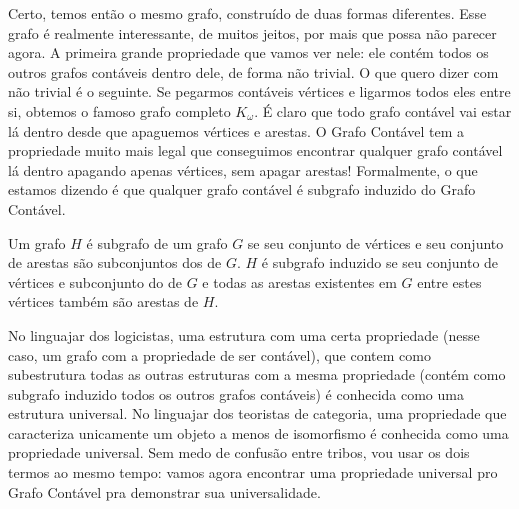\documentclass[11pt]{article}
\theoremstyle{definition}
\theoremstyle{definition}
\theoremstyle{definition}
\theoremstyle{definition}
\theoremstyle{definition}
\theoremstyle{definition}
\theoremstyle{definition}
\theoremstyle{definition}
\newtheorem*{definition*}{Definição}
\newenvironment{definicao*}{
\definecolor{shadecolor}{HTML}{defcfc}
\begin{shaded}
\begin{definition*}
}
{
\end{definition*}
\end{shaded}
}
\theoremstyle{definition}
\theoremstyle{definition}
\theoremstyle{definition}
\theoremstyle{definition}
\theoremstyle{definition}
\begin{document}
Certo, temos então o mesmo grafo, construído de duas formas diferentes. Esse grafo é realmente interessante, de muitos jeitos, por mais que possa não parecer agora. A primeira grande propriedade que vamos ver nele: ele contém todos os outros grafos contáveis dentro dele, de forma não trivial. O que quero dizer com não trivial é o seguinte. Se pegarmos contáveis vértices e ligarmos todos eles entre si, obtemos o famoso grafo completo $K_\omega$. É claro que todo grafo contável vai estar lá dentro desde que apaguemos vértices e arestas. O Grafo Contável tem a propriedade muito mais legal que conseguimos encontrar qualquer grafo contável lá dentro apagando apenas vértices, sem apagar arestas! Formalmente, o que estamos dizendo é que qualquer grafo contável é subgrafo induzido do Grafo Contável.


\begin{definicao*}
    Um grafo $H$ é subgrafo de um grafo $G$ se seu conjunto de vértices e seu conjunto de arestas são subconjuntos dos de $G$. $H$ é subgrafo induzido se seu conjunto de vértices e subconjunto do de $G$ e todas as arestas existentes em $G$ entre estes vértices também são arestas de $H$.
\end{definicao*}

No linguajar dos logicistas, uma estrutura com uma certa propriedade (nesse caso, um grafo com a propriedade de ser contável), que contem como subestrutura todas as outras estruturas com a mesma propriedade (contém como subgrafo induzido todos os outros grafos contáveis) é conhecida como uma estrutura universal. No linguajar dos teoristas de categoria, uma propriedade que caracteriza unicamente um objeto a menos de isomorfismo é conhecida como uma propriedade universal. Sem medo de confusão entre tribos, vou usar os dois termos ao mesmo tempo: vamos agora encontrar uma propriedade universal pro Grafo Contável pra demonstrar sua universalidade.
\end{document}

